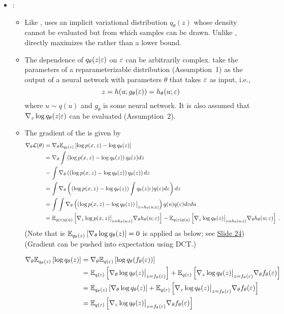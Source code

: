 \documentclass[10pt]{article}
\begin{document}
\begin{itemize}
\item
\uivi:
\begin{itemize}
\item
Like \sivi, \uivi uses an implicit variational distribution $q_\theta(z)$ whose density cannot be evaluated but from which samples can be drawn. Unlike \sivi, \uivi directly maximizes the \elbo rather than a lower bound.
\item
The dependence of $q_\theta(z|\varepsilon)$ on $\varepsilon$ can be arbitrarily complex. \citet{Titsias:2019} take the parameters of a reparameterizable distribution (Assumption~1) as the output of a neural network with parameters $\theta$ that takes $\varepsilon$ as input, i.e.,
\[
z = h(u; g_\theta(\varepsilon)) = h_\theta(u;\varepsilon)
\]
where $u\sim q(u)$ and $g_\theta$ is some neural network. It is also assumed that $\nabla_z\log q_\theta(z|\varepsilon)$ can be evaluated (Assumption~2).
\item
The gradient of the \elbo is given by
\begin{align*}
\nabla_\theta\mathcal{L}(\theta) &= \nabla_\theta\mathbb{E}_{q_\theta(z)}\left[\log p(x,z) - \log q_\theta(z)\right] \\
&= \nabla_\theta\int\left(\log p(x,z) - \log q_\theta(z)\right)q_\theta(z)dz \\
&= \int\nabla_\theta\left(\left(\log p(x,z) - \log q_\theta(z)\right)q_\theta(z)\right)dz \\
&= \int\nabla_\theta\left(\left(\log p(x,z) - \log q_\theta(z)\right)\int q_\theta(z|\varepsilon)q(\varepsilon)d\varepsilon\right)dz \\
&= \int\int\nabla_\theta\left(\left(\log p(x,z) - \log q_\theta(z)\right)\big|_{z=h_\theta(u;\varepsilon)}\right)q(u)q(\varepsilon)d\varepsilon du \\
&= \mathbb{E}_{q(\varepsilon)q(u)}\left[\nabla_z\log p(x,z)\big|_{z=h_\theta(u;\varepsilon)}\nabla_\theta h_\theta(u;\varepsilon)\right] - \mathbb{E}_{q(\varepsilon)q(u)}\left[\nabla_z\log q_\theta(z)\big|_{z=h_\theta(u;\varepsilon)}\nabla_\theta h_\theta(u;\varepsilon)\right] \;.
\end{align*}
(Note that is $\mathbb{E}_{q_\theta(z)}\left[\nabla_\theta\log q_\theta(z)\right]=0$ is applied as below; see \href{https://bayesgroup.github.io/bmml_sem/2018/Molchanov_Implicit%20Models_2018_2.pdf}{Slide 24}) (Gradient can be pushed into expectation using DCT.)

\begin{align*}
\nabla_\theta\mathbb{E}_{q_\theta(z)}\left[\log q_\theta(z)\right] &= \nabla_\theta\mathbb{E}_{q(\varepsilon)}\left[\log q_\theta(f_\theta(\varepsilon))\right] \\
&= \mathbb{E}_{q(\varepsilon)}\left[\nabla_\theta \log q_\theta(z)\big|_{z=f_\theta(\varepsilon)}\right] + \mathbb{E}_{q(\varepsilon)}\left[\nabla_z\log q_\theta(z)\big|_{z=f_\theta(\varepsilon)}\nabla_\theta f_\theta(\varepsilon)\right] \\
&= \mathbb{E}_{q_\theta(z)}\left[\nabla_\theta \log q_\theta(z)\right] + \mathbb{E}_{q(\varepsilon)}\left[\nabla_z\log q_\theta(z)\big|_{z=f_\theta(\varepsilon)}\nabla_\theta f_\theta(\varepsilon)\right] \\
&= \mathbb{E}_{q(\varepsilon)}\left[\nabla_z\log q_\theta(z)\big|_{z=f_\theta(\varepsilon)}\nabla_\theta f_\theta(\varepsilon)\right]
\end{align*}


\end{itemize}
\end{itemize}
\end{document}
